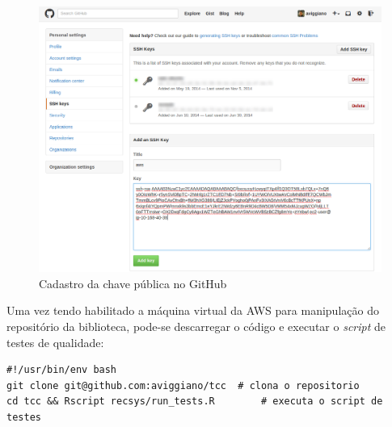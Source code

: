 \begin{figure}[htp]
    \begin{center}
    \includegraphics[width=1\textwidth]{img/github_key}
    \end{center}
    \caption{Cadastro da chave pública no GitHub}
    \label{fig:github_key}
\end{figure}

Uma vez tendo habilitado a máquina virtual da AWS para manipulação do repositório da biblioteca, pode-se descarregar o código e executar o \textit{script} de testes de qualidade:

\begin{lstlisting}
#!/usr/bin/env bash
git clone git@github.com:aviggiano/tcc	# clona o repositorio
cd tcc && Rscript recsys/run_tests.R 		# executa o script de testes
\end{lstlisting}